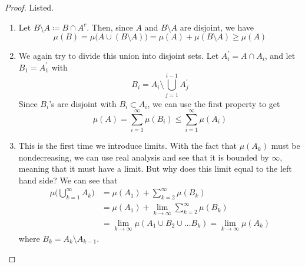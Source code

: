 \documentclass{article}
\begin{document}
    \begin{proof}
    Listed. 
    \begin{enumerate}
      \item Let $B \setminus A \coloneqq B \cap A^c$. Then, since $A$ and $B \setminus A$ are disjoint, we have 
      \begin{equation}
        \mu(B) = \mu\big( A \cup (B \setminus A) \big) = \mu(A) + \mu(B \setminus A) \geq \mu(A)
      \end{equation}
      
      \item We again try to divide this union into disjoint sets. Let $A_i^\prime = A \cap A_i$, and let $B_1 = A_1^\prime$ with 
      \begin{equation}
        B_i = A_i \setminus \bigcup_{j=1}^{i-1} A^\prime_j
      \end{equation}
      Since $B_i$'s are disjoint with $B_i \subset A_i$, we can use the first property to get 
      \begin{equation}
        \mu(A) = \sum_{i=1}^\infty \mu(B_i) \leq \sum_{i=1}^\infty \mu(A_i)
      \end{equation}
      
      \item This is the first time we introduce limits. With the fact that $\mu(A_k)$ must be nondecreasing, we can use real analysis and see that it is bounded by $\infty$, meaning that it must have a limit. But why does this limit equal to the left hand side? We can see that 
      \begin{align}
        \mu\bigg( \bigcup_{k=1}^\infty A_k \bigg) & = \mu(A_1) + \sum_{k=2}^\infty \mu(B_k) \\
        & = \mu(A_1) + \lim_{k \rightarrow \infty} \sum_{k=2}^\infty \mu(B_k) \\
        & = \lim_{k \rightarrow \infty} \mu(A_1 \cup B_2 \cup \ldots B_k)  = \lim_{k \rightarrow \infty} \mu(A_k) 
      \end{align}
      where $B_k = A_k \setminus A_{k-1}$. 
      

\end{enumerate}
\end{proof}
\end{document}
